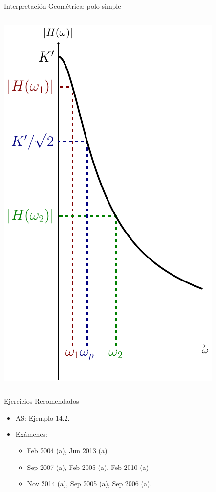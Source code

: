 \documentclass[xcolor={usenames,svgnames,dvipsnames}]{beamer}
\begin{document}
\begin{frame}[label={sec:org39257ce}]{Interpretación Geométrica: polo simple}
\begin{columns}
\begin{column}{0.5\columnwidth}
\begin{center}
\includegraphics[height=0.6\textheight]{figs/PoloGeometricaPlot.pdf}
\end{center}
\end{column}
\end{columns}
\end{frame}

\begin{frame}[label={sec:org9f01a96}]{Ejercicios Recomendados}
\begin{itemize}
\item AS: Ejemplo 14.2.
\item Exámenes:
\begin{itemize}
\item Feb 2004 (a), Jun 2013 (a)
\item Sep 2007 (a), Feb 2005 (a), Feb 2010 (a)
\item Nov 2014 (a), Sep 2005 (a), Sep 2006 (a).
\end{itemize}
\end{itemize}
\end{frame}
\end{document}
